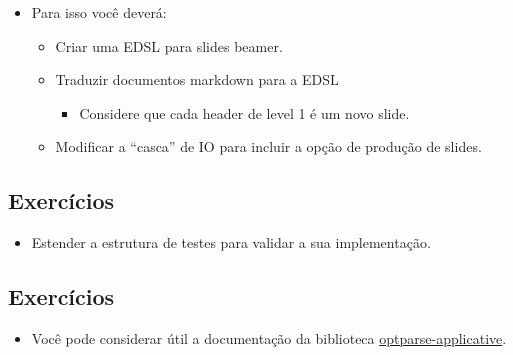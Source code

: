 \documentclass[11pt]{article}
\begin{document}
\begin{itemize}
\item Para isso você deverá:
\begin{itemize}
\item Criar uma EDSL para slides beamer.
\item Traduzir documentos markdown para a EDSL
\begin{itemize}
\item Considere que cada header de level 1 é um novo slide.
\end{itemize}
\item Modificar a ``casca'' de IO para incluir a opção de produção de slides.
\end{itemize}
\end{itemize}
\subsection*{Exercícios}
\label{sec:org6596f66}

\begin{itemize}
\item Estender a estrutura de testes para validar a sua implementação.
\end{itemize}
\subsection*{Exercícios}
\label{sec:org80ab502}

\begin{itemize}
\item Você pode considerar útil a documentação da biblioteca \href{https://github.com/pcapriotti/optparse-applicative}{optparse-applicative}.
\end{itemize}
\end{document}
